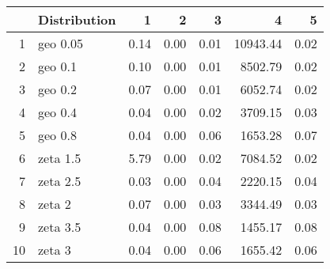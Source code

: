 \begin{table}[ht]
\centering
\begin{tabular}{rlrrrrr}
  \hline
 & Distribution & 1 & 2 & 3 & 4 & 5 \\ 
  \hline
1 & geo 0.05 & 0.14 & 0.00 & 0.01 & 10943.44 & 0.02 \\ 
  2 & geo 0.1 & 0.10 & 0.00 & 0.01 & 8502.79 & 0.02 \\ 
  3 & geo 0.2 & 0.07 & 0.00 & 0.01 & 6052.74 & 0.02 \\ 
  4 & geo 0.4 & 0.04 & 0.00 & 0.02 & 3709.15 & 0.03 \\ 
  5 & geo 0.8 & 0.04 & 0.00 & 0.06 & 1653.28 & 0.07 \\ 
  6 & zeta 1.5 & 5.79 & 0.00 & 0.02 & 7084.52 & 0.02 \\ 
  7 & zeta 2.5 & 0.03 & 0.00 & 0.04 & 2220.15 & 0.04 \\ 
  8 & zeta 2 & 0.07 & 0.00 & 0.03 & 3344.49 & 0.03 \\ 
  9 & zeta 3.5 & 0.04 & 0.00 & 0.08 & 1455.17 & 0.08 \\ 
  10 & zeta 3 & 0.04 & 0.00 & 0.06 & 1655.42 & 0.06 \\ 
   \hline
\end{tabular}
\end{table}
